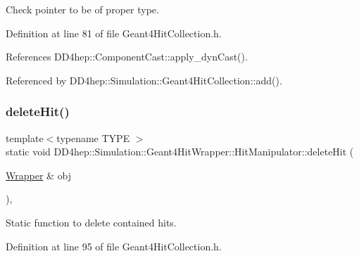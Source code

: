 Check pointer to be of proper type. 



Definition at line 81 of file Geant4\+Hit\+Collection.\+h.



References D\+D4hep\+::\+Component\+Cast\+::apply\+\_\+dyn\+Cast().



Referenced by D\+D4hep\+::\+Simulation\+::\+Geant4\+Hit\+Collection\+::add().

\hypertarget{class_d_d4hep_1_1_simulation_1_1_geant4_hit_wrapper_1_1_hit_manipulator_ac5036ee6d5e3a50a861344b1ec9fbf96}{}\label{class_d_d4hep_1_1_simulation_1_1_geant4_hit_wrapper_1_1_hit_manipulator_ac5036ee6d5e3a50a861344b1ec9fbf96} 
\subsubsection{\texorpdfstring{delete\+Hit()}{deleteHit()}}
{\footnotesize\ttfamily template$<$typename T\+Y\+PE $>$ \\
static void D\+D4hep\+::\+Simulation\+::\+Geant4\+Hit\+Wrapper\+::\+Hit\+Manipulator\+::delete\+Hit (\begin{DoxyParamCaption}\item[{\hyperlink{class_d_d4hep_1_1_simulation_1_1_geant4_hit_wrapper_1_1_hit_manipulator_a4bb62cc7e4979a8d0aea281477a4e38e}{Wrapper} \&}]{obj }\end{DoxyParamCaption})\hspace{0.3cm}{\ttfamily [inline]}, {\ttfamily [static]}}



Static function to delete contained hits. 



Definition at line 95 of file Geant4\+Hit\+Collection.\+h.

\hypertarget{class_d_d4hep_1_1_simulation_1_1_geant4_hit_wrapper_1_1_hit_manipulator_ab56e7a7a62be9eccd4695590159ce941}{}\label{class_d_d4hep_1_1_simulation_1_1_geant4_hit_wrapper_1_1_hit_manipulator_ab56e7a7a62be9eccd4695590159ce941} 
